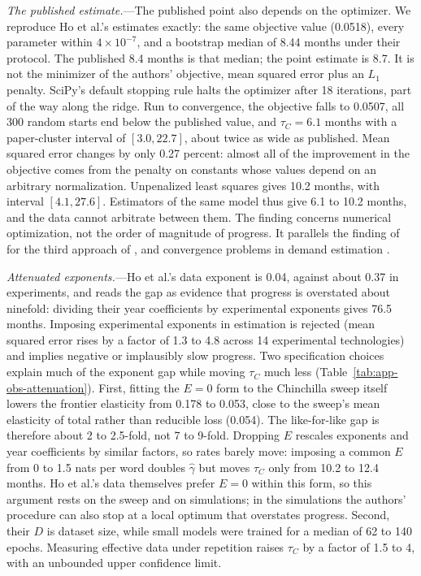 

\emph{The published estimate.}---The published point also depends on the optimizer. We reproduce Ho et al.'s estimates
exactly: the same objective value (0.0518), every parameter within $4\times10^{-7}$, and a bootstrap median of 8.44
months under their protocol. The published 8.4 months is that median; the point estimate is 8.7. It is not the
minimizer of the authors' objective, mean squared error plus an $L_1$ penalty. SciPy's default stopping rule halts the
optimizer after 18 iterations, part of the way along the ridge. Run to convergence, the objective falls to 0.0507, all
300 random starts end below the published value, and $\tau_C=6.1$ months with a paper-cluster interval of $[3.0,22.7]$,
about twice as wide as published. Mean squared error changes by only 0.27 percent: almost all of the improvement in
the objective comes from the penalty on constants whose values depend on an arbitrary normalization. Unpenalized least
squares gives 10.2 months, with interval $[4.1,27.6]$. Estimators of the same model thus give 6.1 to 10.2 months, and
the data cannot arbitrate between them. The finding concerns numerical optimization, not the order of magnitude of
progress. It parallels the finding of \citet{besiroglu2024chinchilla} for the third approach of
\citet{hoffmann2022training}, and convergence problems in demand estimation
\citep{knittel2014estimation,dube2012improving}.

\emph{Attenuated exponents.}---Ho et al.'s data exponent is 0.04, against about 0.37 in experiments, and
\citet{whitfill2025note} reads the gap as evidence that progress is overstated about ninefold: dividing their year
coefficients by experimental exponents gives 76.5 months. Imposing experimental exponents in estimation is rejected
(mean squared error rises by a factor of 1.3 to 4.8 across 14 experimental technologies) and implies negative or
implausibly slow progress. Two specification choices explain much of the exponent gap while moving $\tau_C$ much less
(Table~\ref{tab:app-obs-attenuation}). First, fitting the $E=0$ form to the Chinchilla sweep itself lowers the frontier
elasticity from 0.178 to 0.053, close to the sweep's mean elasticity of total rather than reducible loss (0.054). The
like-for-like gap is therefore about 2 to 2.5-fold, not 7 to 9-fold. Dropping $E$ rescales exponents and year
coefficients by similar factors, so rates barely move: imposing a common $E$ from 0 to 1.5 nats per word doubles
$\hat\gamma$ but moves $\tau_C$ only from 10.2 to 12.4 months. Ho et al.'s data themselves prefer $E=0$ within this
form, so this argument rests on the sweep and on simulations; in the simulations the authors' procedure can also stop
at a local optimum that overstates progress. Second, their $D$ is dataset size, while small models were trained for a
median of 62 to 140 epochs. Measuring effective data under repetition \citep{muennighoff2023scaling} raises $\tau_C$ by
a factor of 1.5 to 4, with an unbounded upper confidence limit.

